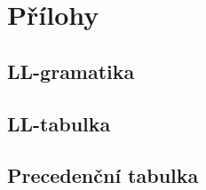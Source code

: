 \documentclass[a4paper, 11pt]{article}
\begin{document}
    \newpage
    
    \section{Přílohy}
    
    \subsection{LL-gramatika}
    
    \subsection{LL-tabulka}
    
    \subsection{Precedenční tabulka}
    
	
	
	
\end{document}
